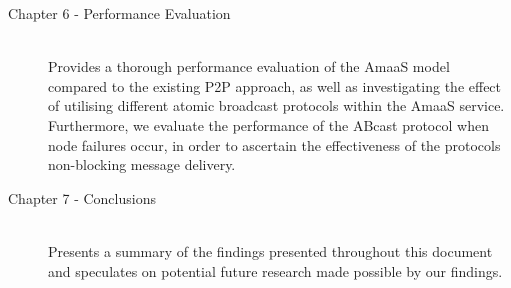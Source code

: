 \begin{description}
             \item[Chapter 6 - Performance Evaluation] \hfill \\
             Provides a thorough performance evaluation of the \textsf{AmaaS} model compared to the existing P2P approach, as well as investigating the effect of utilising different atomic broadcast protocols within the \textsf{AmaaS} service.  Furthermore, we evaluate the performance of the \textsf{ABcast} protocol when node failures occur, in order to ascertain the effectiveness of the protocols non-blocking message delivery.  
             
             \item[Chapter 7 - Conclusions] \hfill \\
             Presents a summary of the findings presented throughout this document and speculates on potential future research made possible by our findings.  
         \end{description}